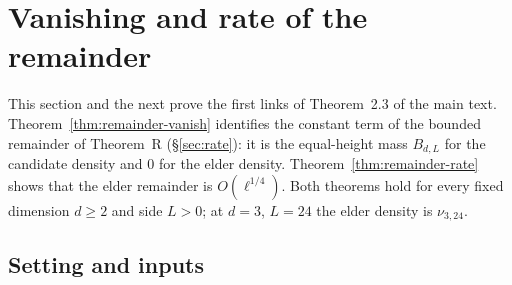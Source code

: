 \section{Vanishing and rate of the remainder}\label{sec:remainder}

This section and the next prove the first links of Theorem~2.3 of the main text. Theorem~\ref{thm:remainder-vanish} identifies the constant term of the bounded remainder of Theorem~R (\S\ref{sec:rate}): it is the equal-height mass $B_{d,L}$ for the candidate density and $0$ for the elder density. Theorem~\ref{thm:remainder-rate} shows that the elder remainder is $O(\ell^{1/4})$. Both theorems hold for every fixed dimension $d\ge2$ and side $L>0$; at $d=3$, $L=24$ the elder density is $\nu_{3,24}$.

\subsection{Setting and inputs}\label{ssec:remainder-setting}

